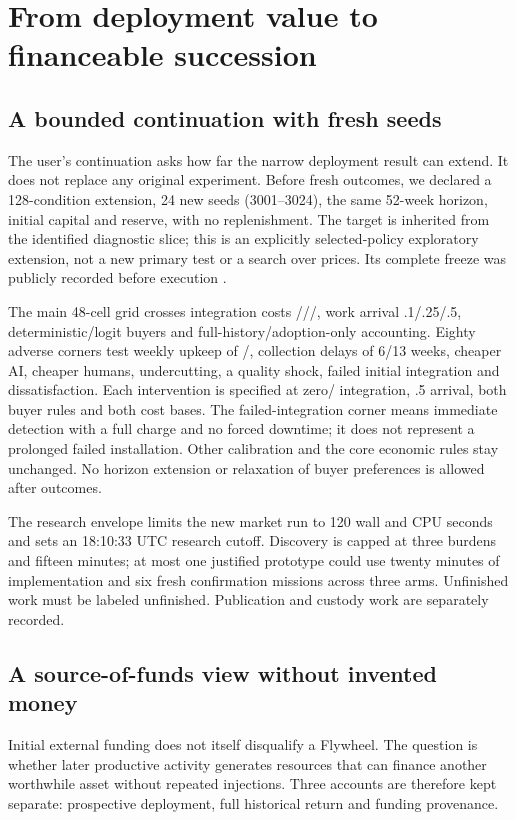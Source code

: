 \section{From deployment value to financeable succession}
\subsection{A bounded continuation with fresh seeds}
The user's continuation asks how far the narrow deployment result can extend. It does not
replace any original experiment. Before fresh outcomes, we declared a 128-condition extension,
24 new seeds (3001--3024), the same 52-week horizon,  initial capital and
 reserve, with no replenishment. The  target is inherited from the
identified diagnostic slice; this is an explicitly selected-policy exploratory extension,
not a new primary test or a search over prices. Its complete freeze was publicly recorded
before execution \cite{successionfreeze}.

The main 48-cell grid crosses integration costs ///,
work arrival .1/.25/.5, deterministic/logit buyers and full-history/adoption-only accounting.
Eighty adverse corners test weekly upkeep of /, collection delays of
6/13 weeks, cheaper AI, cheaper humans, undercutting, a quality shock, failed initial integration
and dissatisfaction. Each intervention is specified at zero/ integration, .5 arrival,
both buyer rules and both cost bases. The failed-integration corner means immediate detection with a full charge and no forced
downtime; it does not represent a prolonged failed installation. Other calibration and the
core economic rules stay unchanged.
No horizon extension or relaxation of buyer preferences is allowed after outcomes.

The research envelope limits the new market run to 120 wall and CPU seconds and sets an
18:10:33 UTC research cutoff. Discovery is capped at three burdens and fifteen minutes;
at most one justified prototype could use twenty minutes of implementation and six fresh
confirmation missions across three arms. Unfinished work must be labeled unfinished.
Publication and custody work are separately recorded.

\subsection{A source-of-funds view without invented money}
Initial external funding does not itself disqualify a Flywheel. The question is whether later
productive activity generates resources that can finance another worthwhile asset without
repeated injections. Three accounts are therefore kept separate: prospective deployment,
full historical return and funding provenance.

